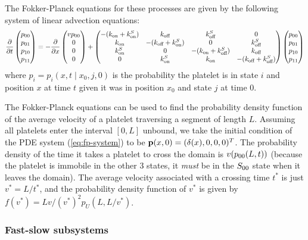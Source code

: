 \documentclass{biophys-new}
\newcommand{\Pder}[2]{\frac{\partial #1}{\partial #2}}
\begin{document}
The Fokker-Planck equations for these processes are given by the
following system of linear advection equations:
\begin{equation}
  \label{eq:fp-system}
  \Pder{}{t}
  \begin{pmatrix}
    p_{00} \\  p_{01} \\ p_{10} \\ p_{11}
  \end{pmatrix}
  =
  -\Pder{}{x}
  \begin{pmatrix}
    \jvVel p_{00} \\ 0 \\ 0 \\ 0
  \end{pmatrix}
  + 
  \begin{pmatrix}
    -(\jvOnFast + \jvOnSlow) & \jvOffFast & \jvOffSlow & 0 \\
    \jvOnFast & -(\jvOffFast + \jvOnSlow) & 0 & \jvOffSlow \\
    \jvOnSlow & 0 & -(\jvOnFast + \jvOffSlow) & \jvOffFast \\
    0 & \jvOnSlow & \jvOnFast & -(\jvOffFast + \jvOffSlow)
  \end{pmatrix}
  \begin{pmatrix}
    p_{00} \\ p_{01} \\ p_{10} \\ p_{11}
  \end{pmatrix}
\end{equation}
where $p_i = p_i(x, t \mid x_0, j, 0)$ is the probability the platelet
is in state $i$ and position $x$ at time $t$ given it was in position
$x_0$ and state $j$ at time $0$.

The Fokker-Planck equations can be used to find the probability
density function of the average velocity of a platelet traversing a
segment of length $L$. Assuming all platelets enter the interval
$[0, L]$ unbound, we take the initial condition of the PDE system
(\ref{eq:fp-system}) to be
$\boldsymbol{\mathbf{p}}(x, 0) = (\delta(x), 0, 0, 0)^T$. The probability density
of the time it takes a platelet to cross the domain is
$v (p_{00}(L,t))$ (because the platelet is immobile in the other
3 states, it \emph{must} be in the $S_{00}$ state when it
leaves the domain). The average velocity associated with a crossing
time $t^*$ is just $v^* = L/t^*$, and the probability density function
of $v^*$ is given by $f(v^*) = Lv/(v^*)^2 p_U(L, L/v^*)$.

\subsubsection*{Fast-slow subsystems}
\end{document}
